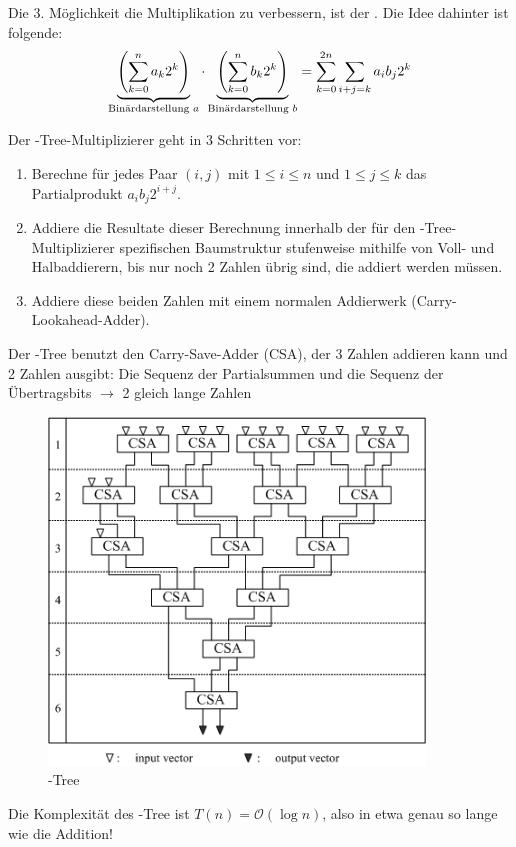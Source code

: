 Die 3. Möglichkeit die Multiplikation zu verbessern, ist der . Die Idee dahinter ist folgende:
\begin{align}
	\underbrace{\left(\sum_{k=0}^{n} a_k2^k\right)}_{\text{Binärdarstellung }a}\cdot \underbrace{\left(\sum_{k=0}^{n} b_k2^k\right)}_{\text{Binärdarstellung }b} = \sum_{k=0}^{2n}\sum_{i+j=k} a_ib_j2^k\notag
\end{align}

Der -Tree-Multiplizierer geht in 3 Schritten vor:
\begin{enumerate}
	\item Berechne für jedes Paar $(i,j)$ mit $1\le i\le n$ und $1\le j\le k$ das Partialprodukt $a_ib_j2^{i+j}$.
	\item Addiere die Resultate dieser Berechnung innerhalb der für den -Tree-Multiplizierer spezifischen Baumstruktur stufenweise mithilfe von Voll- und Halbaddierern, bis nur noch 2 Zahlen übrig sind, die addiert werden müssen.
	\item Addiere diese beiden Zahlen mit einem normalen Addierwerk (Carry-Lookahead-Adder).
\end{enumerate}

Der -Tree benutzt den Carry-Save-Adder (CSA), der 3 Zahlen addieren kann und 2 Zahlen ausgibt: Die Sequenz der Partialsummen und die Sequenz der Übertragsbits $\to$ 2 gleich lange Zahlen

\begin{figure}[ht]
	\centering
	\includegraphics[width=10cm]{images/Wallace-Tree.png}
	\caption{-Tree}
\end{figure}

Die Komplexität des -Tree ist $T(n)=\mathcal{O}(\log n)$, also in etwa genau so lange wie die Addition!